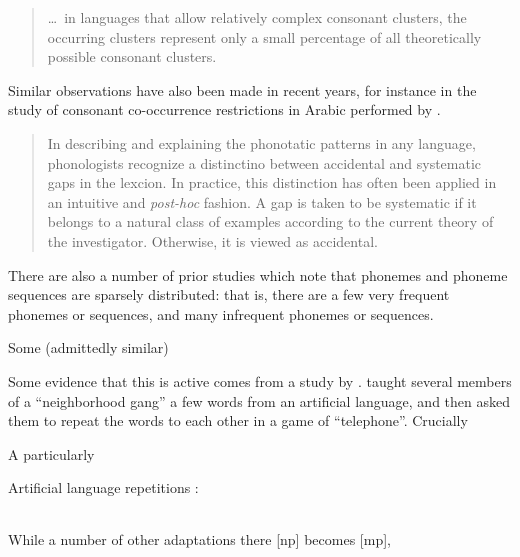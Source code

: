 \begin{quotation}
\ldots~in languages that allow relatively complex consonant clusters, the occurring clusters represent only a small percentage of all theoretically possible consonant clusters. \citep[][94]{Hooper1973}
\end{quotation}

Similar observations have also been made in recent years, for instance in the study of consonant co-occurrence restrictions in Arabic performed by \citeauthor{Frisch2004}.

\begin{quotation}
In describing and explaining the phonotatic patterns in any language, phonologists recognize a distinctino between accidental and systematic gaps in the lexcion. In practice, this distinction has often been applied in an intuitive and \emph{post-hoc} fashion. A gap is taken to be systematic if it belongs to a natural class of examples according to the current theory of the investigator. Otherwise, it is viewed as accidental. \citep[][180]{Frisch2004}
\end{quotation}

There are also a number of prior studies \citet{Kaeding1898,Weiss1961,Sigurd1968,Tambovtsev2007} which note that phonemes and phoneme sequences are sparsely distributed: that is, there are a few very frequent phonemes or sequences, and many infrequent phonemes or sequences. 

Some (admittedly similar) 

Some evidence that this is active comes from a study by \citet[]{Wright1975}. \citeauthor{Wright1975} taught several members of a ``neighborhood gang'' a few words from an artificial language, and then asked them to repeat the words to each other in a game of ``telephone''. Crucially

A particularly 

\ex Artificial language repetitions \citep[from][]{Wright1975}: \\
\begin{tabular}{l l l l l l} %
\end{tabular} \xe

\noindent
While a number of other adaptations there 
[np] becomes [mp], 


